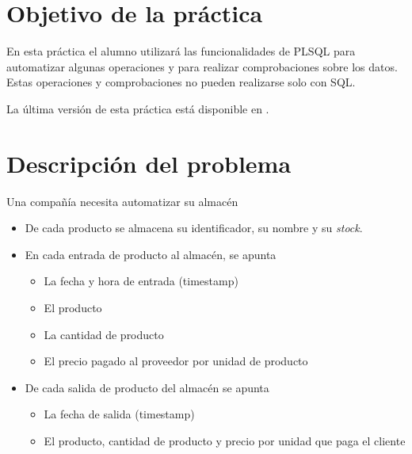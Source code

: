 
\usepackage{needspace}




\renewcommand{\hmwkTitle}{Práctica PLSQL}
\renewcommand{\hmwkClass}{Gestión de Bases de datos}







\primerapagina


\section{Objetivo de la práctica}
En esta práctica el alumno utilizará las funcionalidades de PLSQL para automatizar algunas operaciones y para realizar comprobaciones sobre los datos. Estas operaciones y comprobaciones no pueden realizarse solo con SQL.

La última versión de esta práctica está disponible en .


\section{Descripción del problema}
Una compañía necesita automatizar su almacén
\begin{itemize}
\item De cada producto se almacena su identificador, su nombre y su \textit{stock}.
\item En cada entrada de producto al almacén, se apunta
  \begin{itemize}
  \item La fecha y hora de entrada (timestamp)
  \item El producto
  \item La cantidad de producto
  \item El precio pagado al proveedor por unidad de producto
  \end{itemize}
\item De cada salida de producto del almacén se apunta
  \begin{itemize}
  \item La fecha de salida (timestamp)
  \item El producto, cantidad de producto y precio por unidad que paga el cliente
  \end{itemize}
\end{itemize}




